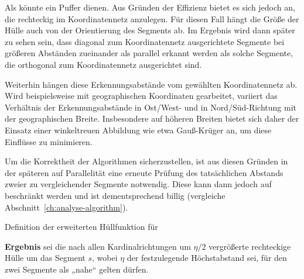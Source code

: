 \documentclass[../main/thesis.tex]{subfiles}
\begin{document}

Als  könnte ein Puffer dienen.
Aus Gründen der Effizienz bietet es sich jedoch an, die  rechteckig im Koordinatennetz anzulegen.
Für diesen Fall hängt die Größe der Hülle auch von der Orientierung des Segments ab.
Im Ergebnis wird dann später zu sehen sein, dass diagonal zum Koordinatennetz ausgerichtete Segmente bei größeren Abständen zueinander als parallel erkannt werden als solche Segmente, die orthogonal zum Koordinatennetz ausgerichtet sind.

Weiterhin hängen diese Erkennungsabstände vom gewählten Koordinatennetz ab.
Wird beispielsweise mit geographischen Koordinaten gearbeitet, variiert das Verhältnis der Erkennungsabstände in Ost/West- und in Nord/Süd-Richtung mit der geographischen Breite.
Insbesondere auf höheren Breiten bietet sich daher der Einsatz einer winkeltreuen Abbildung wie etwa Gauß-Krüger an, um diese Einflüsse zu minimieren.

Um die Korrektheit der Algorithmen sicherzustellen, ist aus diesen Gründen in der späteren  auf Parallelität eine erneute Prüfung des tatsächlichen Abstands zweier zu vergleichender Segmente notwendig.
Diese kann dann jedoch auf  beschränkt werden und ist dementsprechend billig (vergleiche Abschnitt~\ref{ch:analyse-algorithm}).


\begin{algorithmhere}{Definition der erweiterten Hüllfunktion für }
\label{alg:Huelle}
\begin{algorithmic}
	\State \textbf{Ergebnis} sei die nach allen Kardinalrichtungen um $\eta/2$ vergrößerte rechteckige Hülle um das Segment $s$, wobei $\eta$ der festzulegende Höchstabstand sei, für den zwei Segmente als „nahe“ gelten dürfen.
\EndFunction
\end{algorithmic}
\end{algorithmhere}
\end{document}
